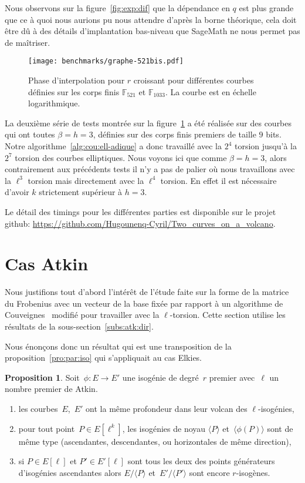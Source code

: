 \documentclass[10pt,a4paper]{book}
\theoremstyle{plain}
\theoremstyle{definition}
\theoremstyle{definition}
\theoremstyle{definition}
\theoremstyle{definition}
\newtheorem{prop}[thm]{Proposition}
\theoremstyle{definition}
\theoremstyle{remark}
\theoremstyle{remark}
\theoremstyle{definition}
\begin{document}
Nous observons sur la figure~\ref{fig:exp:dif} que la dépendance en $q$ est 
plus grande que ce à quoi nous aurions pu nous attendre d'après la borne 
théorique, cela doit être dû à des détails d'implantation bas-niveau que 
SageMath ne nous permet pas de maîtriser.

\begin{figure}
%
\texttt{[image: benchmarks/graphe-521bis.pdf]} 
\caption{\label{fig:exp:niv} Phase d'interpolation pour $r$ croissant pour différentes courbes définies sur les corps finis $\mathbb{F}_{521}$ et $\mathbb{F}_{1033}$. La courbe est en échelle logarithmique.}
\end{figure}

La deuxième série de tests montrée sur la figure~\ref{fig:exp:niv} a été 
réalisée sur des courbes qui ont toutes $\beta=h=3$, définies sur des corps 
finis premiers de taille $9$ bits. Notre algorithme~\ref{alg:cou:ell-adique} a 
donc travaillé avec la $2^4$ torsion jusqu'à la $2^7$ torsion des courbes 
elliptiques. Nous voyons ici que comme $\beta=h=3$, alors contrairement aux 
précédents tests il n'y a pas de palier où nous travaillons avec la 
$\ell^{3}$ torsion mais directement avec la $\ell^4$ torsion. En effet il est 
nécessaire d'avoir $k$ strictement supérieur à $h=3$.

Le détail des timings pour les différentes parties est disponible sur le projet 
github: \url{https://github.com/Hugounenq-Cyril/Two_curves_on_a_volcano}. 

\section{Cas Atkin}
\label{sec:Atk:Con}
Nous justifions tout d'abord l'intérêt de l'étude faite sur la forme de 
la matrice du Frobenius avec un vecteur de la base fixée par rapport à un 
algorithme de Couveignes~\cite{Couveignes96} modifié pour travailler avec la
$\ell$-torsion. Cette section utilise les résultats de la 
sous-section~\ref{subs:atk:dir}.

Nous énonçons donc un résultat qui est une transposition de la 
proposition~\ref{pro:par:iso} qui s'appliquait au cas Elkies.

\begin{prop}\label{pro:par:iso:atk}
Soit~$\phi: E \rightarrow E'$ une isogénie de degré~$r$ premier avec~$\ell$ un 
nombre premier de Atkin.
\begin{enumerate}
\item\label{pro:par:pro:atk}  les courbes~$E$,~$E'$ ont la même profondeur dans leur volcan des
 $\ell$-isogénies,
\item\label{pro:par:fun:atk} pour tout point~$P \in E[\ell^k]$,
les isogénies de noyau $\langle P \rangle$ et~$\langle \phi(P) \rangle$ sont de
même type (ascendantes, descendantes, ou horizontales de même direction),
\item\label{pro:par:asc:atk} si $P \in E[\ell]$ et $P' \in E'[\ell]$ sont tous 
les deux des points générateurs d'isogénies ascendantes alors $E/\langle P 
\rangle$ et~$E'/\langle P' \rangle$ sont encore $r$-isogènes.
\end{enumerate}
\end{prop}
\end{document}
